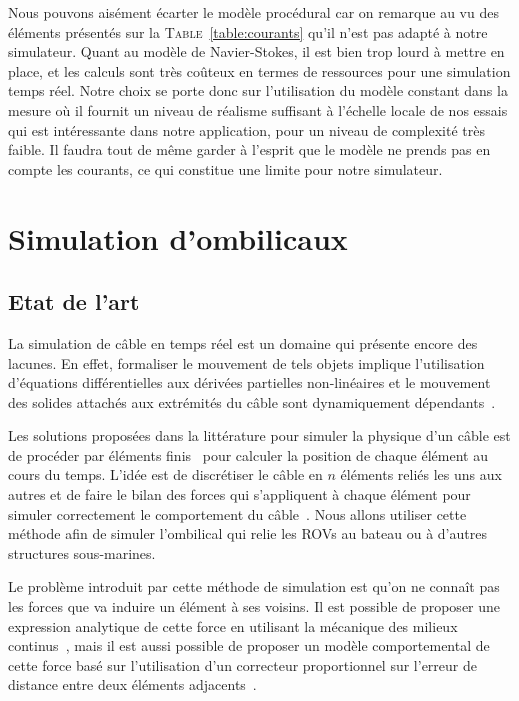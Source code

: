 				Nous pouvons aisément écarter le modèle procédural car on remarque au vu des éléments présentés sur la \textsc{Table}~\ref{table:courants} qu'il n'est pas adapté à notre simulateur. Quant au modèle de Navier-Stokes, il est bien trop lourd à mettre en place, et les calculs sont très coûteux en termes de ressources pour une simulation temps réel. Notre choix se porte donc sur l'utilisation du modèle constant dans la mesure où il fournit un niveau de réalisme suffisant à l'échelle locale de nos essais qui est intéressante dans notre application, pour un niveau de complexité très faible. Il faudra tout de même garder à l'esprit que le modèle ne prends pas en compte les courants, ce qui constitue une limite pour notre simulateur.

		\section{Simulation d'ombilicaux}

			\subsection{Etat de l'art}

				La simulation de câble en temps réel est un domaine qui présente encore des lacunes. En effet, formaliser le mouvement de tels objets implique l'utilisation d'équations différentielles aux dérivées partielles non-linéaires et le mouvement des solides attachés aux extrémités du câble sont dynamiquement dépendants~\cite{blintsov_development_2017}.

				Les solutions proposées dans la littérature pour simuler la physique d'un câble est de procéder par éléments finis~\cite{bender_simulation_methods} pour calculer la position de chaque élément au cours du temps. L'idée est de discrétiser le câble en $n$ éléments reliés les uns aux autres et de faire le bilan des forces qui s'appliquent à chaque élément pour simuler correctement le comportement du câble~\cite{ellis_modeling, blintsov_development_2017,marshall,ganoni_unreal, koenemann_modeling_2017, prabhakar_dynamics_2005}. Nous allons utiliser cette méthode afin de simuler l'ombilical qui relie les \gls{ROV}s au bateau ou à d'autres structures sous-marines.

				Le problème introduit par cette méthode de simulation est qu'on ne connaît pas les forces que va induire un élément à ses voisins. Il est possible de proposer une expression analytique de cette force en utilisant la mécanique des milieux continus~\cite{koenemann_modeling_2017, prabhakar_dynamics_2005}, mais il est aussi possible de proposer un modèle comportemental de cette force basé sur l'utilisation d'un correcteur proportionnel sur l'erreur de distance entre deux éléments adjacents~\cite{ellis_modeling,ganoni_unreal,blintsov_development_2017}.

